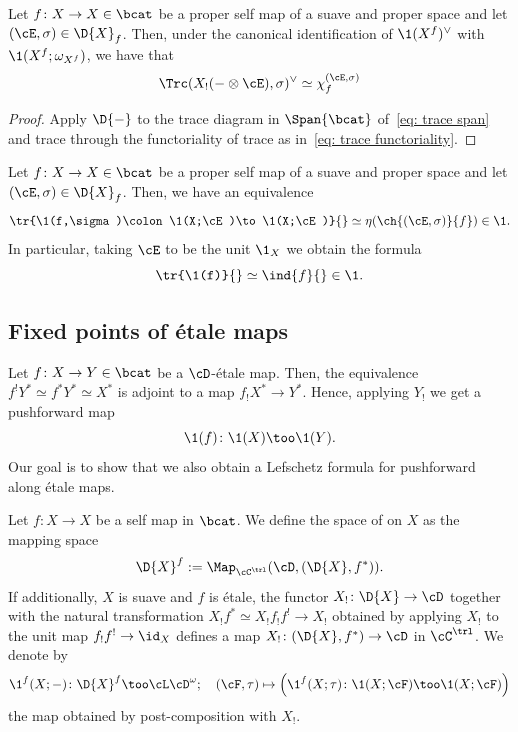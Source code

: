 \begin{prop}
  Let $f\colon X\to X\in \bcat$ be a proper self map of a suave and proper space and
  let $(\cE,\sigma)\in \D{X}_{f}$. Then, under the canonical identification
  of $\1(X^{f})^{\vee}$ with $\1(X^{f};\omega_{X^{f}})$, we have that
  \[\Trc(X_{!}(- \otimes \cE), \sigma)^{\vee} \simeq \chi_{f}^{(\cE,\sigma)}\]
\end{prop}
\begin{proof}
  Apply $\D{-}$ to the trace diagram in $\Span{\bcat}$ of~\eqref{eq: trace span} and trace
  through the functoriality of trace as in~\eqref{eq: trace functoriality}.
\end{proof}

\begin{cor}
  Let $f\colon X\to X\in \bcat$ be a proper self map of a suave and proper space
  and let $(\cE,\sigma)\in \D{X}_{f}$. Then, we have an equivalence
  \[ \tr{\1(f,\sigma)\colon\1(X;\cE)\to \1(X;\cE)}{}
  \simeq \eta (\ch{(\cE,\sigma)}{f}) \in \1.\]
In particular, taking $\cE$ to be the unit $\1_{X}$ we obtain the formula
\[ \tr{\1(f)}{}\simeq \ind{f}{} \in \1.\]
\end{cor}


\subsection{Fixed points of \'etale maps}

Let $f\colon X\to Y\in \bcat$ be a $\cD$-\'etale map. Then, the equivalence
$f^{!}Y^{\ast}\simeq f^{\ast}Y^{\ast} \simeq X^{\ast}$ is adjoint to a map
$f_{!}X^{\ast}\to Y^{\ast}$. Hence, applying $Y_{!}$ we get a pushforward map
\[ \1(f)\colon \1(X)\too \1(Y).\]
Our goal is to show that we also obtain a Lefschetz formula for pushforward
along \'etale maps.

\begin{defn}
  Let $f\colon X\to X$ be a self map in $\bcat$. We define the space of
   on $X$ as the mapping space
  \[\D{X}^{f}:= \Map_{\cC^{\trl}}(\cD, (\D{X},f^{\ast})).\]
  If additionally, $X$ is suave and $f$ is \'etale, the functor
  $X_{!}\colon \D{X}\to \cD$ together with the natural transformation
  $X_{!}f^{\ast}\simeq X_{!}f_{!}f^{!}\to X_{!}$ obtained by applying $X_{!}$
  to the unit map $f_{!}f^{!}\to \id_{X}$ defines a map $X_{!}\colon (\D{X},f^{\ast})\to \cD$
  in $\cC^{\trl}$. We denote by
  \[ \1^{f}(X;-)\colon \D{X}^{f}\too \cL\cD^{\omega};\quad
    (\cF,\tau)\mapsto \left(\1^{f}(X;\tau)\colon \1(X;\cF)\too \1(X;\cF)\right)\]
  the map obtained by post-composition with $X_{!}$.
\end{defn}

